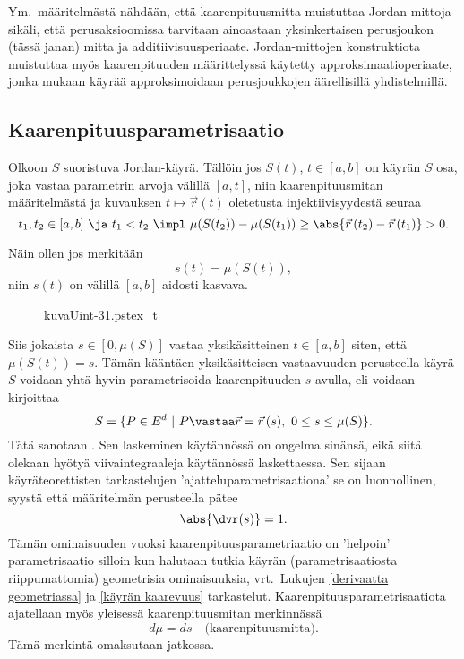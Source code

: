 Ym.\ määritelmästä nähdään, että kaarenpituusmitta muistuttaa Jordan-mittoja sikäli, että 
perusaksioomissa tarvitaan ainoastaan yksinkertaisen perusjoukon (tässä janan) mitta ja 
additiivisuusperiaate. Jordan-mittojen konstruktiota muistuttaa myös kaarenpituuden 
määrittelyssä käytetty approksimaatioperiaate, jonka mukaan käyrää approksimoidaan 
perusjoukkojen äärellisillä yhdistelmillä. 

\subsection*{Kaarenpituusparametrisaatio}

Olkoon $S$ suoristuva Jordan-käyrä. Tällöin jos $S(t)$, $t\in [a,b]$ on käyrän $S$ osa, joka
vastaa parametrin arvoja välillä $[a,t]$, niin kaarenpituusmitan määritelmästä ja kuvauksen
$t\mapsto\vec r(t)$ oletetusta injektiivisyydestä seuraa
\[
t_1,t_2\in [a,b] \ \ja \ t_1<t_2 \ 
               \impl \ \mu(S(t_2))-\mu(S(t_1)) \ge \abs{\vec r\,(t_2)-\vec r\,(t_1)} > 0.
\]
\begin{multicols}{2} \raggedcolumns
Näin ollen jos merkitään
\[
s(t)=\mu(S(t)),
\]
niin $s(t)$ on välillä $[a,b]$ aidosti kasvava. 
\begin{figure}[H]
\begin{center}
{kuvaUint-31.pstex_t}
\end{center}
\end{figure}
\end{multicols}
Siis jokaista $s\in [0,\mu(S)]$ vastaa yksikäsitteinen $t\in [a,b]$ siten, että
$\mu(S(t))=s$. Tämän kääntäen yksikäsitteisen vastaavuuden perusteella käyrä $S$ voidaan yhtä
hyvin parametrisoida kaarenpituuden $s$ avulla, eli voidaan kirjoittaa
\[
S=\{P\in E^d \ | \ P\vastaa \vec r=\vec r\,(s), \ 0\leq s\leq\mu(S)\}.
\]
Tätä sanotaan . Sen laskeminen käytännössä on ongelma
sinänsä, eikä siitä olekaan hyötyä viivaintegraaleja käytännössä laskettaessa. Sen sijaan
käyräteorettisten tarkastelujen 'ajatteluparametrisaationa' se on luonnollinen, syystä että
määritelmän perusteella pätee
\[
\abs{\dvr(s)}=1.
\]
Tämän ominaisuuden vuoksi kaarenpituusparametriaatio on 'helpoin' parametrisaatio silloin kun
halutaan tutkia käyrän (parametrisaatiosta riippumattomia) geometrisia ominaisuuksia, vrt.\
Lukujen \ref{derivaatta geometriassa} ja \ref{käyrän kaarevuus} tarkastelut.
Kaarenpituusparametrisaatiota ajatellaan myös yleisessä kaarenpituusmitan merkinnässä
\[
d\mu=ds \quad \text{(kaarenpituusmitta)}.
\]
Tämä merkintä omaksutaan jatkossa.

